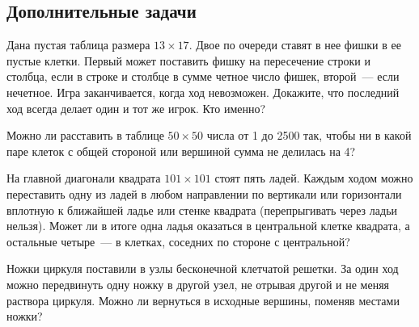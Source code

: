 

\subsection*{Дополнительные задачи}



\begin{problems}

\item
Дана пустая таблица размера $13 \times 17$.
Двое по очереди ставят в нее фишки в ее пустые клетки.
Первый может поставить фишку на пересечение строки и столбца, если в строке
и столбце в сумме четное число фишек, второй~--- если нечетное.
Игра заканчивается, когда ход невозможен.
Докажите, что последний ход всегда делает один и тот же игрок.
Кто именно?

\item
Можно ли расставить в таблице $50 \times 50$ числа от 1 до 2500 так, чтобы
ни в какой паре клеток с общей стороной или вершиной сумма не делилась на 4?

\item
На главной диагонали квадрата $101 \times 101$ стоят пять ладей.
Каждым ходом можно переставить одну из ладей в любом направлении по вертикали
или горизонтали вплотную к ближайшей ладье или стенке квадрата
(перепрыгивать через ладьи нельзя).
Может ли в итоге одна ладья оказаться в центральной клетке квадрата,
а остальные четыре~--- в клетках, соседних по стороне с центральной?

\item
Ножки циркуля поставили в узлы бесконечной клетчатой решетки.
За один ход можно передвинуть одну ножку в другой узел, не отрывая другой
и не меняя раствора циркуля.
Можно ли вернуться в исходные вершины, поменяв местами ножки?

\end{problems}

